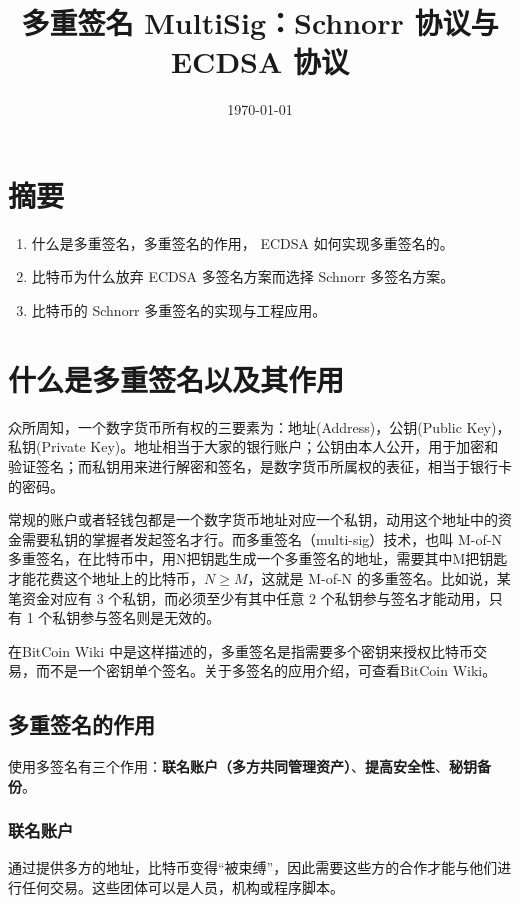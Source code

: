 \documentclass[a4paper,10pt]{article}
\title{多重签名 MultiSig：Schnorr 协议与 ECDSA 协议}
\date{\today}
\begin{document}
\maketitle

\section{摘要}
\begin{enumerate}
  \item 什么是多重签名，多重签名的作用， ECDSA 如何实现多重签名的。
  \item 比特币为什么放弃 ECDSA 多签名方案而选择 Schnorr 多签名方案。
  \item 比特币的 Schnorr 多重签名的实现与工程应用。
\end{enumerate}

\section{什么是多重签名以及其作用}

众所周知，一个数字货币所有权的三要素为：地址(Address)，公钥(Public Key)，私钥(Private Key)。地址相当于大家的银行账户；公钥由本人公开，用于加密和验证签名；而私钥用来进行解密和签名，是数字货币所属权的表征，相当于银行卡的密码。

常规的账户或者轻钱包都是一个数字货币地址对应一个私钥，动用这个地址中的资金需要私钥的掌握者发起签名才行。而多重签名（multi-sig）技术，也叫 M-of-N 多重签名，在比特币中，用N把钥匙生成一个多重签名的地址，需要其中M把钥匙才能花费这个地址上的比特币，\(N\ge M\)，这就是 M-of-N 的多重签名。比如说，某笔资金对应有 3 个私钥，而必须至少有其中任意 2 个私钥参与签名才能动用，只有 1 个私钥参与签名则是无效的。

在BitCoin Wiki\cite{BitCoin Wiki} 中是这样描述的，多重签名是指需要多个密钥来授权比特币交易，而不是一个密钥单个签名。关于多签名的应用介绍，可查看BitCoin Wiki\cite{BitCoin Wiki}。

\subsection{ 多重签名的作用}
使用多签名有三个作用：\textbf{联名账户（多方共同管理资产）}、\textbf{提高安全性}、\textbf{秘钥备份}。

\subsubsection{联名账户}

通过提供多方的地址，比特币变得“被束缚”，因此需要这些方的合作才能与他们进行任何交易。这些团体可以是人员，机构或程序脚本。
\end{document}
